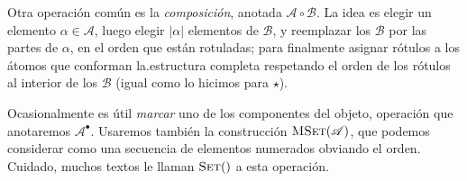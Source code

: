   Otra operación común es la \emph{composición},
  anotada \(\mathscr{A} \circ \mathscr{B}\).
  La idea es elegir un elemento \(\alpha \in \mathscr{A}\),
  luego elegir \(\lvert \alpha \rvert\) elementos
  de \(\mathscr{B}\),
  y reemplazar los \(\mathscr{B}\) por las partes de \(\alpha\),
  en el orden que están rotuladas;
  para finalmente asignar rótulos a los átomos
  que conforman la.estructura completa
  respetando el orden de los rótulos
  al interior de los \(\mathscr{B}\)
  (igual como lo hicimos para \(\star\)).

  Ocasionalmente es útil \emph{marcar}
  uno de los componentes del objeto,
  operación que anotaremos \(\mathscr{A}^\bullet\).
  Usaremos también la construcción \(\operatorname{\textsc{MSet}}(\mathscr{A})\),
  que podemos considerar como una secuencia de elementos numerados
  obviando el orden.
  Cuidado,
  muchos textos le llaman \(\operatorname{\textsc{Set}}()\) a esta operación.


